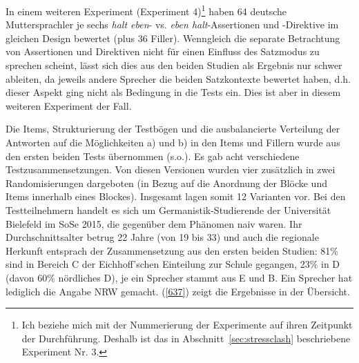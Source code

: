 In einem weiteren Experiment (Experiment 4)\footnote{Ich beziehe mich mit der Nummerierung der Experimente auf ihren Zeitpunkt der Durchführung. Deshalb ist das in Abschnitt~\ref{sec:stressclash} beschriebene Experiment Nr. 3.} haben 64 deutsche Muttersprachler je sechs \textit{halt eben}- vs. \textit{eben halt}-Assertionen und -Direktive im glei\-chen Design bewertet (plus 36 Filler). Wenngleich die separate Betrachtung von Assertionen und Direktiven nicht für einen Einfluss des Satzmodus zu sprechen scheint, lässt sich dies aus den beiden Studien als Ergebnis nur schwer ableiten, da jeweils andere Sprecher die beiden Satzkontexte bewertet haben, d.h. dieser Aspekt ging nicht als Bedingung in die Tests ein. Dies ist aber in diesem weiteren Experiment der Fall.

Die Items, Strukturierung der Testbögen und die ausbalancierte Verteilung der Antworten auf die Möglichkeiten a) und b) in den Items und Fillern wurde aus den ersten beiden Tests übernommen (s.o.). Es gab acht verschiedene Testzusammensetzungen. Von
diesen Versionen wurden vier zusätzlich in zwei Randomisie\-rungen dargeboten (in Bezug
auf die Anordnung der Blöcke und Items innerhalb eines Blockes). Insgesamt lagen somit
12 Varianten vor. Bei den Testteilnehmern handelt es sich um Germanistik-Studierende der Universität Bielefeld im SoSe 2015, die gegenüber dem Phänomen naiv waren. Ihr Durchschnittsalter betrug 22 Jahre (von 19 bis 33) und auch die regionale Herkunft entsprach der Zusammensetzung aus den ersten beiden Studien: 81\% sind in Bereich C der Eichhoff'schen Einteilung zur Schule gegangen, 23\% in D (davon 60\% nördliches D), je ein Sprecher stammt aus E und B. Ein Sprecher hat lediglich die Angabe \glqq NRW\grqq{} gemacht. (\ref{637}) zeigt die Ergebnisse in der Übersicht.

